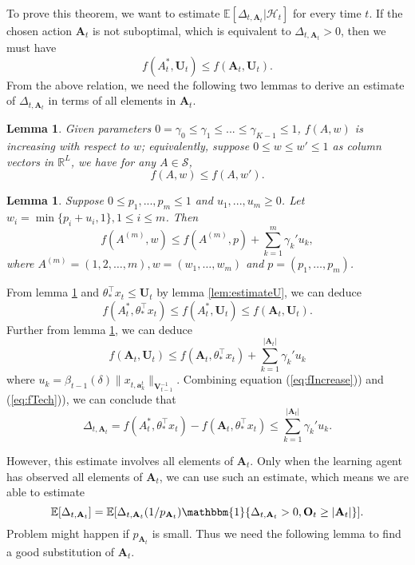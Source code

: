 \documentclass{article}
\newcommand{\EE}{\mathbb{E}}
\newcommand{\RR}{\mathbb{R}}
\newcommand{\bOne}{\mathbbm{1}}
\newcommand{\bA}{\mathbf{A}}
\newcommand{\ba}{\mathbf{a}}
\newcommand{\bO}{\mathbf{O}}
\newcommand{\bU}{\mathbf{U}}
\newcommand{\bV}{\mathbf{V}}
\newcommand{\cH}{\mathcal{H}}
\newcommand{\cS}{\mathcal{S}}
\newcommand{\abs}[1]{\left| #1 \right|}
\newcommand{\norm}[1]{\| #1 \|}
\newtheorem{lemma}[theorem]{Lemma}%
\begin{document}
To prove this theorem, we want to estimate $\EE[\Delta_{t, \bA_t}|\cH_t]$ for every time $t$. If the chosen action $\bA_t$ is not suboptimal, which is equivalent to $\Delta_{t, \bA_t} > 0$, then we must have
$$
f(A_t^*, \bU_t) \leq f(\bA_t, \bU_t).
$$
From the above relation, we need the following two lemmas to derive an estimate of $\Delta_{t, \bA_t}$ in terms of all elements in $\bA_t$. 

\begin{lemma}
\label{lem:increasing} 
Given parameters $0= \gamma_0 \leq \gamma_1 \leq ... \leq \gamma_{K-1} \leq 1$, $f(A, w)$ is increasing with respect to $w$; equivalently, suppose $0 \leq w \leq w' \leq 1$ as column vectors in $\RR^L$, we have for any $A\in\cS$,
$$
f(A, w) \leq f(A, w').
$$
\end{lemma}

\begin{lemma}
\label{lem:estimateTech}
Suppose $0 \leq p_1,...,p_m \leq 1$ and $u_1,...,u_m \geq 0$. Let $w_i = \min\{p_i + u_i, 1\}, 1 \leq i \leq m$. Then
$$
f(A^{(m)}, w) \leq f(A^{(m)}, p) + \sum_{k=1}^{m} \gamma_k' u_k,
$$
where $A^{(m)} = (1,2,\ldots,m), w = (w_1, \ldots, w_m)$ and $p = (p_1, \ldots, p_m)$.
\end{lemma}

From lemma \ref{lem:increasing} and $\theta_*^{\top}x_t \leq \bU_t$ by lemma \ref{lem:estimateU}, we can deduce 
\begin{equation}
\label{eq:fIncrease}
f(A_t^*, \theta_*^{\top}x_t) \leq f(A_t^*, \bU_t) \leq f(\bA_t, \bU_t).
\end{equation}
Further from lemma \ref{lem:estimateTech}, we can deduce
\begin{equation}
\label{eq:fTech}
f(\bA_t, \bU_t) \leq f(\bA_t, \theta_*^{\top}x_t) + \sum_{k=1}^{\abs{\bA_t}} \gamma_k' u_k
\end{equation}
where $u_k = \beta_{t-1}(\delta)\norm{x_{t, \ba_k^t}}_{\bV_{t-1}^{-1}}$. Combining equation (\ref{eq:fIncrease})) and (\ref{eq:fTech})), we can conclude that
$$
\Delta_{t, \bA_t} = f(A_t^*, \theta_*^{\top}x_t) - f(\bA_t, \theta_*^{\top}x_t) \leq \sum_{k=1}^{\abs{\bA_t}} \gamma_k' u_k.
$$

However, this estimate involves all elements of $\bA_t$. Only when the learning agent has observed all elements of $\bA_t$, we can use such an estimate, which means we are able to estimate
$$
\EE[\Delta_{t, \bA_t}] = \EE[\Delta_{t, \bA_t}(1/p_{\bA_t}) \bOne\{\Delta_{t, \bA_t} > 0, \bO_t \geq \abs{\bA_t}\}].
$$
Problem might happen if $p_{\bA_t}$ is small. Thus we need the following lemma to find a good substitution of $\bA_t$.
\end{document}
